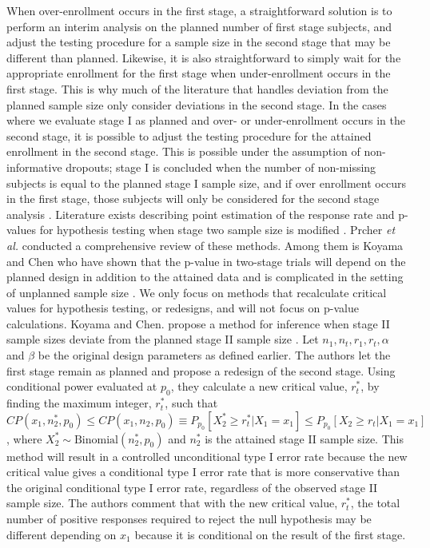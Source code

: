 \documentclass[12pt]{report}\usepackage[]{graphicx}\usepackage[]{color}
\newlength{\li}\setlength{\li}{14.48pt}
\newlength{\di}\setlength{\di}{-3.5mm}
\begin{document}
When over-enrollment occurs in the first stage, a straightforward solution is to perform an interim analysis on the planned number of first stage subjects, and adjust the testing procedure for a sample size in the second stage that may be different than planned. Likewise, it is also straightforward to simply wait for the appropriate enrollment for the first stage when under-enrollment occurs in the first stage. This is why much of the literature that handles deviation from the planned sample size only consider deviations in the second stage. In the cases where we evaluate stage I as planned and over- or under-enrollment occurs in the second stage, it is possible to adjust the testing procedure for the attained enrollment in the second stage.  This is possible under the assumption of non-informative dropouts; stage I is concluded when the number of non-missing subjects is equal to the planned stage I sample size, and if over enrollment occurs in the first stage, those subjects will only be considered for the second stage analysis \cite{Koyama}. Literature exists describing point estimation of the response rate and p-values for hypothesis testing when stage two sample size is modified \cite{Koyama}\cite{Whitehead}\cite{Changpoint}\cite{Guo}\cite{Jungest}\cite{Tsai}\cite{Jungpvalue}. Prcher \textit{et al.} \cite{Porcher} conducted a comprehensive review of these methods. Among them is Koyama and Chen who have shown that the p-value in two-stage trials will depend on the planned design in addition to the attained data and is complicated in the setting of unplanned sample size \cite{Koyama}. We only focus on methods that recalculate critical values for hypothesis testing, or redesigns, and will not focus on p-value calculations. Koyama and Chen. propose a method for inference when stage II sample sizes deviate from the planned stage II sample size \cite{Koyama}. Let $n_1, n_t, r_1, r_t, \alpha$ and $\beta$ be the original design parameters as defined earlier. The authors let the first stage remain as planned and propose a redesign of the second stage. Using conditional power evaluated at $p_0$, they calculate a new critical value, $r_t^\ast$, by finding the maximum integer, $r_t^\ast$, such that $CP(x_1, n_2^\ast, p_0) \leq CP(x_1, n_2, p_0) \equiv P_{p_0}[X_2^\ast \geq r_t^\ast | X_1 = x_1] \leq P_{p_0}[X_2 \geq r_t | X_1 = x_1]$, where $X_2^\ast \sim \mbox{Binomial}(n_2^\ast, p_0)$ and $n_2^\ast$ is the attained stage II sample size. This method will result in a controlled unconditional type I error rate because the new critical value gives a conditional type I error rate that is more conservative than the original conditional type I error rate, regardless of the observed stage II sample size. The authors comment that with the new critical value, $r_t^\ast$, the total number of positive responses required to reject the null hypothesis may be different depending on $x_1$ because it is conditional on the result of the first stage. \\
\end{document}
